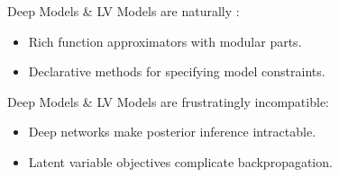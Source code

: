 \begin{frame}

    Deep Models \& LV Models are naturally :
    
    \begin{itemize}
        \item Rich function approximators with modular parts.
        \item Declarative methods for specifying model constraints.
    \end{itemize}

    \vspace{0.5cm}
    \pause

    Deep Models \& LV Models are frustratingly \alert{incompatible}:

    \begin{itemize}
        \item Deep networks make posterior inference intractable.  
        \item Latent variable objectives complicate backpropagation.
    \end{itemize}
    
\end{frame}